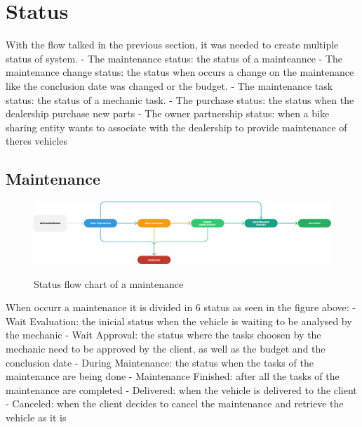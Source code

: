 \section{Status} 

With the flow talked in the previous section, it was needed to create multiple status of system.
- The maintenance status: the status of a mainteannce
- The maintenance change status: the status when occurs a change on the maintenance like the conclusion date was changed or the budget.
- The maintenance task status: the status of a mechanic task.
- The purchase status: the status when the dealership purchase new parts
- The owner partnership status: when a bike sharing entity wants to associate with the dealership to provide maintenance of theres vehicles

\subsection{Maintenance} 


\begin{figure}[h]
  \caption{Status flow chart of a maintenance}
  \centering
  \includegraphics[width=\textwidth]{figs/Status/Maintenance/StatusDiagram}
  \label{fig:figure2}
\end{figure}


When occurr a maintenance it is divided in 6 status as seen in the figure above:
- Wait Evaluation: the inicial status when the vehicle is waiting to be analysed by the mechanic
- Wait Approval: the status where the tasks choosen by the mechanic need to be approved by the client, as well as the budget and the conclusion date
- During Maintenance: the status when the tasks of the maintenance are being done
- Maintenance Finished: after all the tasks of the maintenance are completed
- Delivered: when the vehicle is delivered to the client
- Canceled: when the client decides to cancel the maintenance and retrieve the vehicle as it is


